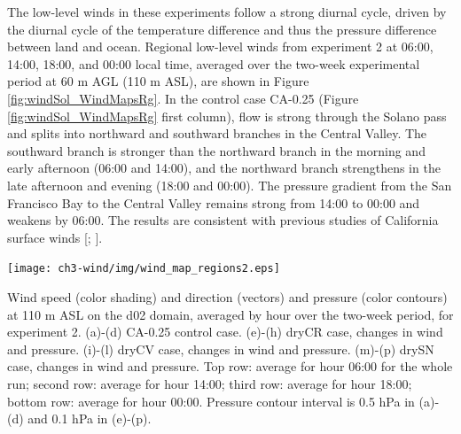 The low-level winds in these experiments follow a strong diurnal cycle, driven by the diurnal cycle of the temperature difference and thus the pressure difference between land and ocean.  Regional low-level winds from experiment 2 at 06:00, 14:00, 18:00, and 00:00 local time, averaged over the two-week experimental period at 60 m AGL (110 m ASL), are shown in Figure \ref{fig:windSol_WindMapsRg}.  In the control case CA-0.25 (Figure \ref{fig:windSol_WindMapsRg} first column), flow is strong through the Solano pass and splits into northward and southward branches in the Central Valley.  The southward branch is stronger than the northward branch in the morning and early afternoon (06:00 and 14:00), and the northward branch strengthens in the late afternoon and evening (18:00 and 00:00).  The pressure gradient from the San Francisco Bay to the Central Valley remains strong from 14:00 to 00:00 and weakens by 06:00.  The results are consistent with previous studies of California surface winds [\cite{zhong2004diurnal}; \cite{mansbach2010synoptic}].

\begin{FPfigure}
\texttt{[image: ch3-wind/img/wind\_map\_regions2.eps]}
\caption{Wind speed (color shading) and direction (vectors) and pressure (color contours) at 110 m ASL on the d02 domain, averaged by hour over the two-week period, for experiment 2.  (a)-(d) CA-0.25 control case.  (e)-(h) dryCR case, changes in wind and pressure.  (i)-(l) dryCV case, changes in wind and pressure.  (m)-(p) drySN case, changes in wind and pressure.  Top row: average for hour 06:00 for the whole run; second row: average for hour 14:00; third row: average for hour 18:00; bottom row: average for hour 00:00.  Pressure contour interval is 0.5 hPa in (a)-(d) and 0.1 hPa in (e)-(p).}
\label{fig:windSol_WindMapsRg}
\end{FPfigure}


